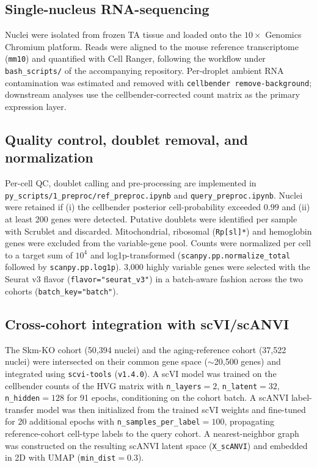 \subsection*{Single-nucleus RNA-sequencing}
Nuclei were isolated from frozen TA tissue and loaded onto the $10\times$ Genomics Chromium platform. Reads were aligned to the mouse reference transcriptome (\texttt{mm10}) and quantified with Cell Ranger, following the workflow under \texttt{bash\_scripts/} of the accompanying repository. Per-droplet ambient RNA contamination was estimated and removed with \texttt{cellbender remove-background}; downstream analyses use the cellbender-corrected count matrix as the primary expression layer.

\subsection*{Quality control, doublet removal, and normalization}
Per-cell QC, doublet calling and pre-processing are implemented in \texttt{py\_scripts/1\_preproc/ref\_preproc.ipynb} and \texttt{query\_preproc.ipynb}. Nuclei were retained if (i) the cellbender posterior cell-probability exceeded $0.99$ and (ii) at least 200 genes were detected. Putative doublets were identified per sample with Scrublet and discarded. Mitochondrial, ribosomal (\texttt{Rp[sl]*}) and hemoglobin genes were excluded from the variable-gene pool. Counts were normalized per cell to a target sum of $10^{4}$ and log1p-transformed (\texttt{scanpy.pp.normalize\_total} followed by \texttt{scanpy.pp.log1p}). 3{,}000 highly variable genes were selected with the Seurat v3 flavor (\texttt{flavor="seurat\_v3"}) in a batch-aware fashion across the two cohorts (\texttt{batch\_key="batch"}).

\subsection*{Cross-cohort integration with scVI/scANVI}
The Skm-KO cohort (50{,}394 nuclei) and the aging-reference cohort (37{,}522 nuclei) were intersected on their common gene space ($\sim$20{,}500 genes) and integrated using \texttt{scvi-tools} (\texttt{v1.4.0}). A scVI model was trained on the cellbender counts of the HVG matrix with \texttt{n\_layers}$=2$, \texttt{n\_latent}$=32$, \texttt{n\_hidden}$=128$ for 91 epochs, conditioning on the cohort batch. A scANVI label-transfer model was then initialized from the trained scVI weights and fine-tuned for 20 additional epochs with \texttt{n\_samples\_per\_label}$=100$, propagating reference-cohort cell-type labels to the query cohort. A nearest-neighbor graph was constructed on the resulting scANVI latent space (\texttt{X\_scANVI}) and embedded in 2D with UMAP (\texttt{min\_dist}$=0.3$).

